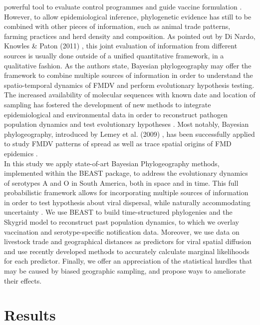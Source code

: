 \documentclass[10pt]{article}
\begin{document}
powerful tool to evaluate control programmes and guide vaccine formulation \cite{Maradei2011,Maradei2013}.\\
\indent However, to allow epidemiological inference, phylogenetic evidence has still to be combined with other pieces of information, such as animal trade patterns, farming practices and herd density and composition. As pointed out by Di Nardo, Knowles \&  Paton (2011) \cite{combining}, this joint evaluation of information from different sources is usually done outside of a unified quantitative framework, in a qualitative fashion. As the authors state, Bayesian phylogeography may offer the framework to combine multiple sources of information in order to understand the spatio-temporal dynamics of FMDV and perform evolutionary hypothesis testing.\\
\indent The increased availability of molecular sequences with known date and location of sampling has fostered the development of new methods to integrate epidemiological and environmental data in order to reconstruct pathogen population dynamics and test evolutionary hypotheses \cite{MEP,grenfell}. Most notably, Bayesian phylogeography, introduced by Lemey et al. (2009) \cite{roots}, has been successfully applied to study FMDV patterns of spread as well as trace spatial  origins of FMD epidemics \cite{Carvalho2012,bulgaria,phymal}.\\
\indent In this study we apply state-of-art Bayesian Phylogeography methods, implemented within the BEAST \cite{BEAST} package, to address the evolutionary dynamics of serotypes A and O in South America, both in space and in time. This full probabilistic framework allows for incorporating multiple sources of information in order to test hypothesis about viral dispersal, while naturally accommodating uncertainty \cite{roots,towards}. We use BEAST to build time-structured phylogenies and the Skygrid model to reconstruct past population dynamics, to which we overlay vaccination and serotype-specific notification data. Moreover, we use data on livestock trade and geographical distances as predictors for viral spatial diffusion and use recently developed methods to accurately calculate marginal likelihoods for each predictor. Finally, we offer an appreciation of the statistical hurdles that may be caused by biased geographic sampling, and propose ways to ameliorate their effects.\\
\section*{Results}
\end{document}
